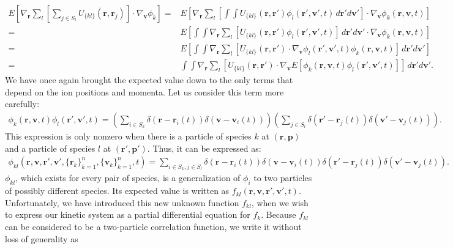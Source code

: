 \documentclass{article}
\begin{document}
\begin{align*}
E\left[\nabla_\mathbf{r}\sum_l\left[\sum_{j\in S_l}U_{\{kl\}}(\mathbf{r},\mathbf{r}_j)\right]\cdot\nabla_\mathbf{v}\phi_k\right]=&E\left[\nabla_\mathbf{r}\sum_l\left[\int\int U_{\{kl\}}(\mathbf{r},\mathbf{r}')\phi_l(\mathbf{r}',\mathbf{v}',t)\,d\mathbf{r}'d\mathbf{v}'\right]\cdot\nabla_\mathbf{v}\phi_k(\mathbf{r},\mathbf{v},t)\right]\\
=&E\left[\int\int\nabla_\mathbf{r}\sum_l\left[U_{\{kl\}}(\mathbf{r},\mathbf{r}')\phi_l(\mathbf{r}',\mathbf{v}',t)\right]\,d\mathbf{r}'d\mathbf{v}'\cdot\nabla_\mathbf{v}\phi_k(\mathbf{r},\mathbf{v},t)\right]\\
=&E\left[\int\int\nabla_\mathbf{r}\sum_l\left[U_{\{kl\}}(\mathbf{r},\mathbf{r}')\cdot\nabla_\mathbf{v} \phi_l(\mathbf{r}',\mathbf{v}',t)\phi_k(\mathbf{r},\mathbf{v},t)\right]\,d\mathbf{r}'d\mathbf{v}'\right]\\
=&\int\int\nabla_\mathbf{r}\sum_l\left[U_{\{kl\}}(\mathbf{r},\mathbf{r}')\cdot\nabla_\mathbf{v}E\left[\phi_k(\mathbf{r},\mathbf{v},t)\phi_l(\mathbf{r}',\mathbf{v}',t)\right]\right]\,d\mathbf{r}'d\mathbf{v}'.
\end{align*}We have once again brought the expected value down to the only terms that depend on the ion positions and momenta. Let us consider this term more carefully:
\begin{align*}
\phi_k(\mathbf{r},\mathbf{v},t)\phi_l(\mathbf{r}',\mathbf{v}',t)=\left(\sum_{i\in S_k}\delta(\mathbf{r}-\mathbf{r}_i(t))\delta(\mathbf{v}-\mathbf{v}_i(t))\right)\left(\sum_{j\in S_l}\delta(\mathbf{r}'-\mathbf{r}_j(t))\delta(\mathbf{v}'-\mathbf{v}_j(t))\right).
\end{align*}This expression is only nonzero when there is a particle of species $k$ at $(\mathbf{r},\mathbf{p})$ and a particle of species $l$ at $(\mathbf{r}',\mathbf{p}')$. Thus, it can be expressed as:
\begin{align*}
\phi_{kl}(\mathbf{r},\mathbf{v},\mathbf{r}',\mathbf{v}',\{\mathbf{r}_k\}_{k=1}^n,\{\mathbf{v}_k\}_{k=1}^n,t)=\sum_{i\in S_k,j\in S_l}\delta(\mathbf{r}-\mathbf{r}_i(t))\delta(\mathbf{v}-\mathbf{v}_i(t))\delta(\mathbf{r}'-\mathbf{r}_j(t))\delta(\mathbf{v}'-\mathbf{v}_j(t)).
\end{align*}$\phi_{kl}$, which exists for every pair of species, is a generalization of $\phi_i$ to two particles of possibly different species. Its expected value is written as $f_{kl}(\mathbf{r},\mathbf{v},\mathbf{r}',\mathbf{v}',t)$. Unfortunately, we have introduced this new unknown function $f_{kl}$, when we wish to express our kinetic system as a partial differential equation for $f_k$. Because $f_{kl}$ can be considered to be a two-particle correlation function, we write it without loss of generality as
\end{document}
